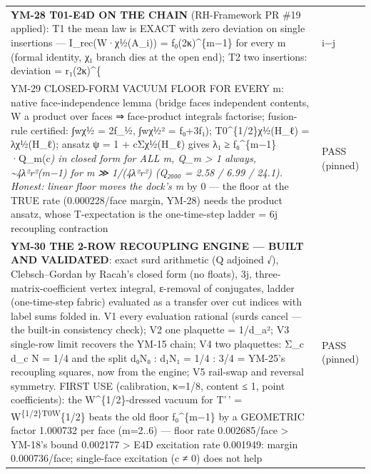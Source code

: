 \begin{longtable}[]{@{}
  >{\raggedright\arraybackslash}p{}
  >{\raggedright\arraybackslash}p{}@{}}
\textbf{YM-28 T01-E4D ON THE CHAIN} (RH-Framework PR \#19 applied): T1 the mean law is EXACT with zero deviation on single insertions --- I\_rec(W·χ½(A\_i)) = f₀(2κ)\^{}\{m−1\} for every m (formal identity, χ₁ branch dies at the open end); T2 two insertions: deviation = r₁(2κ)\^{}\{ & i−j \\
YM-29 CLOSED-FORM VACUUM FLOOR FOR EVERY m: native face-independence lemma (bridge faces independent contents, W a product over faces ⇒ face-product integrals factorise; fusion-rule certified: ∫wχ½ = 2f\_½, ∫wχ½² = f₀+3f₁); T0\^{}\{1/2\}χ½(H\_ℓ) = λχ½(H\_ℓ); ansatz ψ = 1 + cΣχ½(H\_ℓ) gives λ₁ ≥ f₀\^{}\{m−1\}·Q\_m(c\emph{) in closed form for ALL m, Q\_m \textgreater{} 1 always, \textasciitilde4λ²r²(m−1) for m ≫ 1/(4λ²r²) (Q₂₀₀₀ = 2.58 / 6.99 / 24.1). Honest: linear floor moves the dock's m} by 0 --- the floor at the TRUE rate (0.000228/face margin, YM-28) needs the product ansatz, whose T-expectation is the one-time-step ladder = 6j recoupling contraction & PASS (pinned) \\
\textbf{YM-30 THE 2-ROW RECOUPLING ENGINE --- BUILT AND VALIDATED}: exact surd arithmetic (Q adjoined √), Clebsch--Gordan by Racah's closed form (no floats), 3j, three-matrix-coefficient vertex integral, ε-removal of conjugates, ladder (one-time-step fabric) evaluated as a transfer over cut indices with label sums folded in. V1 every evaluation rational (surds cancel --- the built-in consistency check); V2 one plaquette = 1/d\_a²; V3 single-row limit recovers the YM-15 chain; V4 two plaquettes: Σ\_c d\_c N = 1/4 and the split d₀N₀ : d₁N₁ = 1/4 : 3/4 = YM-25's recoupling squares, now from the engine; V5 rail-swap and reversal symmetry. FIRST USE (calibration, κ=1/8, content ≤ 1, point coefficients): the W\^{}\{1/2\}-dressed vacuum for T'\,' = W\textsuperscript{\{1/2\}T0W}\{1/2\} beats the old floor f₀\^{}\{m−1\} by a GEOMETRIC factor 1.000732 per face (m=2..6) --- floor rate 0.002685/face \textgreater{} YM-18's bound 0.002177 \textgreater{} E4D excitation rate 0.001949: margin 0.000736/face; single-face excitation (c ≠ 0) does not help & PASS (pinned) \\

\end{longtable}
